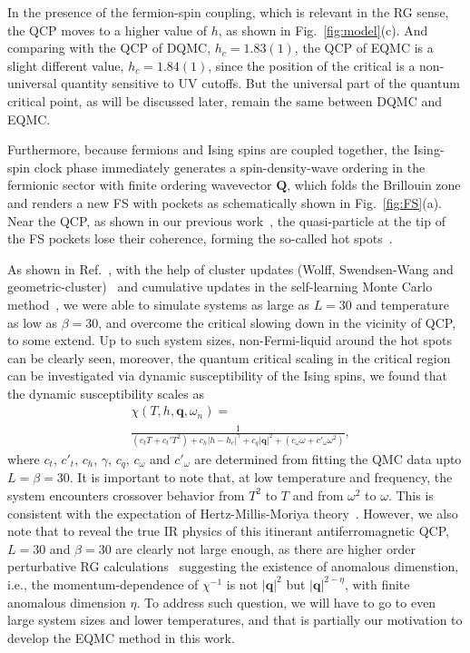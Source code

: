 \documentclass[aps,prx,twocolumn,superscriptaddress,showpacs,floatfix]{revtex4-1}
\begin{document}
In the presence of the fermion-spin coupling, which is relevant in the RG sense, the QCP moves to a higher value of $h$, as shown in Fig.~\ref{fig:model}(c). And comparing with the QCP of DQMC, $h_c=1.83(1)$, the QCP of EQMC is a slight different value, $h_c=1.84(1)$, since the position of the critical is a non-universal quantity sensitive to UV cutoffs. But the universal part of the quantum critical point, as will be discussed later, remain the same between DQMC and EQMC.

Furthermore, because fermions and Ising spins are coupled together, the Ising-spin clock phase immediately generates a spin-density-wave ordering in the fermionic sector with finite ordering wavevector $\mathbf{Q}$, which folds the Brillouin zone and renders a new FS with pockets as schematically shown in Fig.~\ref{fig:FS}(a). Near the QCP, as shown in our previous work~\cite{ZHLiu2017}, the quasi-particle at the tip of the FS pockets lose their coherence, forming the so-called hot spots~\cite{Metlitski2010a,Metlitski2010b,Schlief2017}.

As shown in Ref.~, with the help of cluster updates (Wolff, Swendsen-Wang and geometric-cluster)~\cite{Swendsen1987,Wolff1989,Heringa1998} and cumulative updates in the self-learning Monte Carlo method~\cite{liu2016self,liu2016fermion,Xu2016self,Nagai2017},
we were able to simulate systems as large as $L=30$ and temperature as low as $\beta=30$, and overcome the critical slowing down in the vicinity of QCP, to some extend. Up to such system sizes, non-Fermi-liquid around the hot spots can be clearly seen, moreover, the quantum critical scaling in the critical region can be investigated via dynamic susceptibility of the Ising spins, we found that the dynamic susceptibility scales as
\begin{align}
&\chi(T,h,\mathbf{q},\omega_n)= \nonumber\\
& \frac{1}{(c_{t}T+c_{t}' T^{2})+c_{h}|h-h_c|^{\gamma}+c_q |\mathbf{q}|^2 + (c_{\omega}\omega+c'_{\omega}\omega^{2})},
\label{eq:susceptibility}
\end{align}
where $c_t$, $c'_t$, $c_h$, $\gamma$, $c_q$, $c_{\omega}$ and $c'_{\omega}$ are determined from fitting the QMC data upto $L=\beta=30$. It is important to note that, at low temperature and frequency, the system encounters crossover behavior from $T^2$ to $T$ and from $\omega^2$ to $\omega$. This is consistent with the expectation of Hertz-Millis-Moriya theory~\cite{Hertz1976,Millis1993,Moriya1985}. However, we also note that to reveal the true IR physics of this itinerant antiferromagnetic QCP, $L=30$ and $\beta =30$ are clearly not large enough, as there are higher order perturbative RG calculations~\cite{Metzner2003,Abanov2004,Metlitski2010b,Schlief2017} suggesting the existence of anomalous dimenstion, i.e., the momentum-dependence of $\chi^{-1}$ is not $|\mathbf{q}|^2$ but $|\mathbf{q}|^{2-\eta}$, with finite anomalous dimension $\eta$. To address such question, we will have to go to even large system sizes and lower temperatures, and that is partially our motivation to develop the EQMC method in this work.
\end{document}
